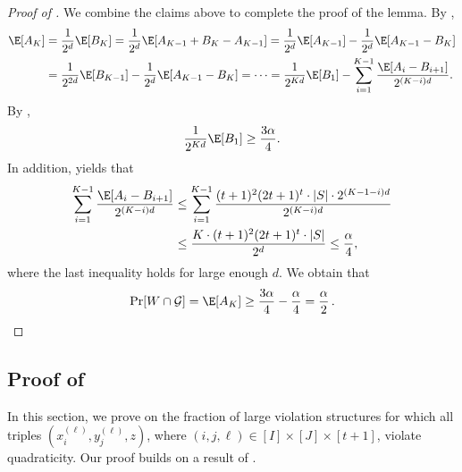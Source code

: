 \documentclass{toc}
\begin{document}
\begin{proof}[Proof of ]
We combine the claims above to complete the proof of the lemma. By ,
\begin{align*}
    \E[A_{K}] &= \frac{1}{2^d}\E[B_{K}] = \frac{1}{2^d}\E[A_{K-1} + B_{K} - A_{K-1}] = \frac{1}{2^d}\E[A_{K-1}] - \frac{1}{2^d}\E[A_{K-1}-B_{K}] \\
    &= \frac{1}{2^{2d}}\E[B_{K-1}] - \frac{1}{2^d}\E[A_{K-1}-B_{K}] 
    = \dots = \frac{1}{2^{Kd}}\E[B_1] - \sum_{i=1}^{K-1} \frac{\E[A_i - B_{i+1}]}{2^{(K-i)d}}.
\end{align*}
By ,
\begin{equation*}
     \frac{1}{2^{Kd}}\E[B_1] \geq \frac{3\alpha}{4}. 
\end{equation*}
In addition,  yields that
\begin{align*}
    \sum_{i=1}^{K-1} \frac{\E[A_i - B_{i+1}]}{2^{(K-i)d}} &\leq  \sum_{i=1}^{K-1}\frac{(t+1)^2(2t+1)^t\cdot |S| \cdot 2^{(K-1-i)d}}{2^{(K-i)d}}\\ 
    &\leq \frac{K \cdot (t+1)^2(2t+1)^t\cdot |S|}{2^d} \leq \frac{\alpha}{4},
\end{align*}
where the last inequality holds for large enough $d$. We obtain that
%
%
\[
\Pr[W \cap \mathcal{G}] = \E[A_{K}] \geq \frac{3\alpha}{4} - \frac{\alpha}{4} = \frac{\alpha}{2}\,. \qedhere \]
\end{proof}



  
 

\subsection{Proof of } \label{sec:quadratic_witness}

In this section, we prove  on the fraction of large violation structures for which all triples $(x_i^{(\ell)}, y_{j}^{(\ell)}, z)$, where  $(i,j,\ell) \in [I]\times [J]\times [t+1]$, %
violate quadraticity. Our proof builds on a result of \cite{AlonKKLR05}.  
\end{document}
